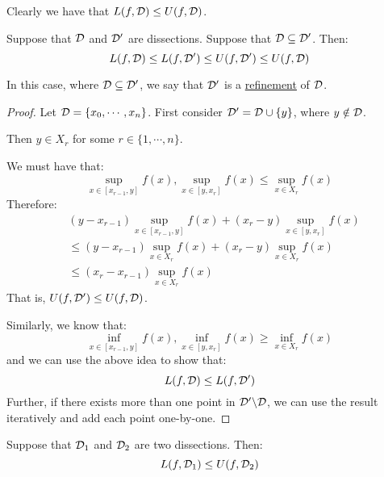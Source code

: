 \documentclass[../Main.tex]{subfiles}
\begin{document}
Clearly we have that $L(f, \mathcal{D}) \leq U(f, \mathcal{D})$.
\begin{lemma}
    Suppose that $\mathcal{D}$ and $\mathcal{D}'$ are dissections. Suppose that $\mathcal{D} \subseteq \mathcal{D}'$. Then:
    \begin{equation*}
        L(f, \mathcal{D}) \leq L(f, \mathcal{D}') \leq U(f, \mathcal{D}') \leq U(f, \mathcal{D})
    \end{equation*}
    \label{lemRefinement}
\end{lemma}
\begin{remark}
    In this case, where $\mathcal{D} \subseteq \mathcal{D}'$, we say that $\mathcal{D}'$ is a \underline{refinement} of $\mathcal{D}$.
\end{remark}
\begin{proof}
    Let $\mathcal{D} = \{x_0, \cdots, x_n\}$. First consider $\mathcal{D}' = \mathcal{D} \cup \{y\}$, where $y \notin\mathcal{D}$.\par
    Then $y \in X_r$ for some $r \in \{1, \cdots, n\}$.

    We must have that:
    \begin{equation*}
        \sup_{x \in [x_{r - 1}, y]} f(x), \sup_{x \in [y, x_r]} f(x) \leq \sup_{x \in X_r} f(x)
    \end{equation*}
    Therefore:
    \begin{align*}
        &(y - x_{r - 1}) \sup_{x \in [x_{r - 1}, y]}f(x) + (x_r - y) \sup_{x \in [y, x_r]} f(x) \\
        &\leq (y - x_{r - 1}) \sup_{x \in X_r}f(x) + (x_r - y) \sup_{x \in X_r} f(x) \\
        &\leq (x_r - x_{r - 1}) \sup_{x \in X_r}f(x)
    \end{align*}
    That is, $U(f, \mathcal{D}') \leq U(f, \mathcal{D})$.

    Similarly, we know that:
    \begin{equation*}
        \inf_{x \in [x_{r - 1}, y]} f(x), \inf_{x \in [y, x_r]} f(x) \geq \inf_{x \in X_r} f(x)
    \end{equation*}
    and we can use the above idea to show that:
    \begin{equation*}
        L(f, \mathcal{D}) \leq L(f, \mathcal{D}')
    \end{equation*}
    Further, if there exists more than one point in $\mathcal{D}' \backslash \mathcal{D}$, we can use the result iteratively and add each point one-by-one.
\end{proof}
\begin{lemma}
    Suppose that $\mathcal{D}_1$ and $\mathcal{D}_2$ are two dissections. Then:
    \begin{equation*}
        L(f, \mathcal{D}_1) \leq U(f, \mathcal{D}_2)
    \end{equation*}
    \label{lemUpperSumAlwaysGreater}
\end{lemma}
\end{document}
